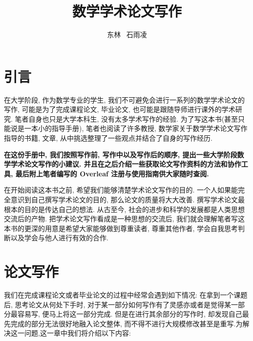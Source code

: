 \documentclass{booki}
\begin{document}
\title{数学学术论文写作}
\author{东林 \ 石雨凌}
\maketitlepage
\tableofcontents
\setlength{\parskip}{1.5em}
\newpage
\chapter{引言}
在大学阶段, 作为数学专业的学生, 我们不可避免会进行一系列的数学学术论文的写作, 可能是为了完成课程论文, 毕业论文, 也可能是跟随导师进行课外的学术研究. 笔者自身也只是大学本科生, 没有太多学术写作的经验. 为了写这本书(甚至只能说是一本小的指导手册), 笔者也阅读了许多教授, 数学家关于数学学术论文写作指导的书籍, 文章, 从中挑选整理了一些观点并结合了自身的写作经历.

{\textbf{在这份手册中, 我们按照写作前, 写作中以及写作后的顺序, 提出一些大学阶段数学学术论文写作的小建议. 并且在之后介绍一些获取论文写作资料的方法和协作工具, 最后附上笔者编写的 Overleaf 注册与使用指南供大家随时查阅.}}

\par 在开始阅读这本书之前, 希望我们能够清楚学术论文写作的目的. 一个人如果能完全意识到自己撰写学术论文的目的, 那么论文的质量将大大改善. 撰写学术论文最根本的目的是传达自己的想法. 从古至今, 社会的进步和科学的发展都是人类思想交流后的产物. 把学术论文写作看成是一种思想的交流后, 我们就会理解笔者写这本书的更深的用意是希望大家能够做到尊重读者, 尊重其他作者, 学会自我思考判断以及学会与他人进行有效的合作.

\chapter{论文写作}
我们在完成课程论文或者毕业论文的过程中经常会遇到如下情况: 在拿到一个课题后, 思考论文从何处下手时, 对于某一部分如何写作有了灵感亦或者是觉得某一部分最容易写, 便马上将这一部分完成. 但是在进行其余部分的写作时, 却发现自己最先完成的部分无法很好地融入论文整体, 而不得不进行大规模修改甚至是重写.为解决这一问题,这一章中我们将介绍以下内容: 
{
\begin{center}
    \noindent{}
    \ \\ \vspace{0.25cm} \  \\ 
\end{center}}
%
\end{document}
